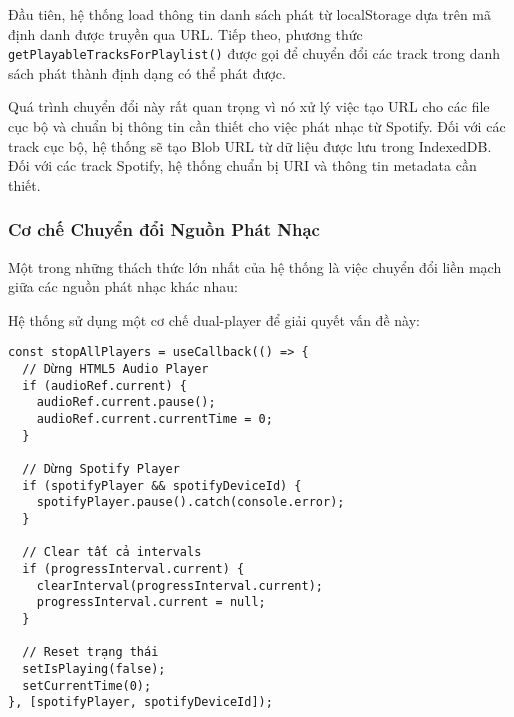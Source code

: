 \documentclass[12pt,a4paper]{article}
\begin{document}
Đầu tiên, hệ thống load thông tin danh sách phát từ localStorage dựa trên mã định danh được truyền qua URL. Tiếp theo, phương thức \texttt{getPlayableTracksForPlaylist()} được gọi để chuyển đổi các track trong danh sách phát thành định dạng có thể phát được.

Quá trình chuyển đổi này rất quan trọng vì nó xử lý việc tạo URL cho các file cục bộ và chuẩn bị thông tin cần thiết cho việc phát nhạc từ Spotify. Đối với các track cục bộ, hệ thống sẽ tạo Blob URL từ dữ liệu được lưu trong IndexedDB. Đối với các track Spotify, hệ thống chuẩn bị URI và thông tin metadata cần thiết.

\subsubsection{Cơ chế Chuyển đổi Nguồn Phát Nhạc}

Một trong những thách thức lớn nhất của hệ thống là việc chuyển đổi liền mạch giữa các nguồn phát nhạc khác nhau:

\begin{center}
\end{center}

Hệ thống sử dụng một cơ chế dual-player để giải quyết vấn đề này:

\begin{lstlisting}[caption={Tệp: src/components/audioPlayer/unifiedPlayer.jsx}]
const stopAllPlayers = useCallback(() => {
  // Dừng HTML5 Audio Player
  if (audioRef.current) {
    audioRef.current.pause();
    audioRef.current.currentTime = 0;
  }

  // Dừng Spotify Player
  if (spotifyPlayer && spotifyDeviceId) {
    spotifyPlayer.pause().catch(console.error);
  }

  // Clear tất cả intervals
  if (progressInterval.current) {
    clearInterval(progressInterval.current);
    progressInterval.current = null;
  }

  // Reset trạng thái
  setIsPlaying(false);
  setCurrentTime(0);
}, [spotifyPlayer, spotifyDeviceId]);
\end{lstlisting}
\end{document}
